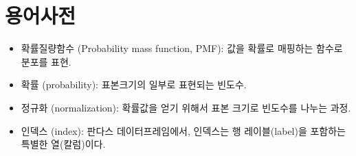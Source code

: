 \section{용어사전}

\begin{itemize}

\item 확률질량함수 (Probability mass function, PMF): 값을 확률로 매핑하는 함수로 분포를 표현.

\item 확률 (probability): 
표본크기의 일부로 표현되는 빈도수.

\item 정규화 (normalization): 
확률값을 얻기 위해서 표본 크기로 빈도수를 나누는 과정.

\item 인덱스 (index): 
판다스 데이터프레임에서, 인덱스는 행 레이블(label)을 포함하는 특별한 열(칼럼)이다.

\end{itemize}
